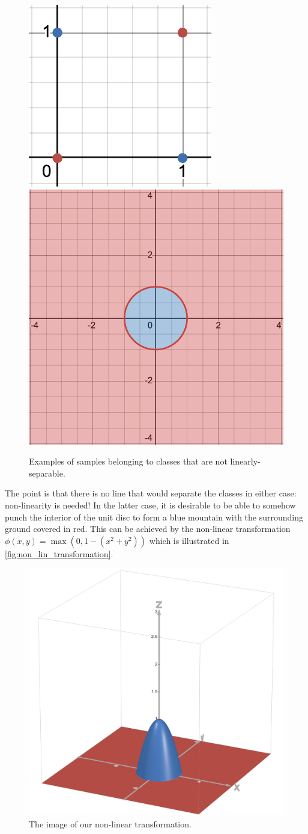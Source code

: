 \documentclass[11pt]{article}
\begin{document}
\begin{figure}[ht]
    \centering
    \includegraphics[width=0.40\columnwidth]{./figures/neural_nets/NLA_xor.png}
    \hspace{20pt}
    \includegraphics[width=0.40\columnwidth]{./figures/neural_nets/NLA_circle.png}
    \caption{Examples of samples belonging to classes that are not linearly-separable.}
    \label{fig:non_linearly_separable}
\end{figure}

The point is that there is no line that would separate the classes in either case: non-linearity is needed! In the latter case, it is desirable to be able to somehow punch the interior of the unit disc to form a blue mountain with the surrounding ground covered in red. This can be achieved by the non-linear transformation $\phi(x,y)=\max(0,1-(x^2+y^2))$ which is illustrated in \autoref{fig:non_lin_transformation}.

\begin{figure}[ht]
    \centering
    \includegraphics[width=0.40\columnwidth]{./figures/neural_nets//NLA_non_lin_transform.png}
    \caption{The image of our non-linear transformation.}
    \label{fig:non_lin_transformation}
\end{figure}
\end{document}
